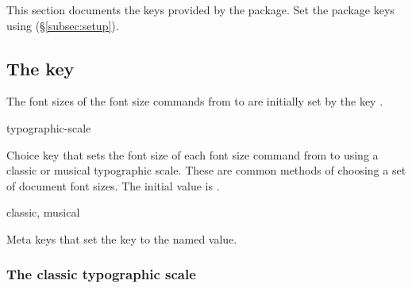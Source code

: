 \documentclass{beerydoc}
\begin{document}
This section documents the keys provided by the  package.
Set the package keys using  (\S\ref{subsec:setup}).

\subsection{The key }
\label{subsec:typographicscale}

The font sizes of the font size commands from  to  are
initially set by the key .

\begin{variable}{typographic-scale}
  \begin{syntax}
  \end{syntax}
  Choice key that sets the font size of each font size command from 
  to  using a classic or musical typographic scale.
  These are common methods of choosing a set of document font sizes.
  The initial value is .
\end{variable}

\begin{variable}{classic, musical}
  \begin{syntax}
  \end{syntax}
  Meta keys that set the key  to the named value.
\end{variable}

\subsubsection{The classic typographic scale}
\label{subsubsec:classictypographicscale}
\end{document}
